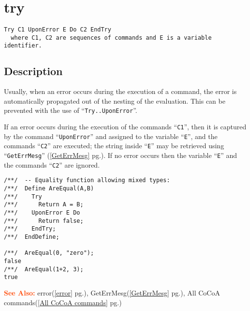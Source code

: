 \documentclass[a4paper]{mybook}
\newenvironment{command}{}{} %
\newcommand\SeeAlso{\par\textcolor{OrangeRed}{\textbf{\large See Also: }}}
\begin{document}
\section{try}
\label{try}
\begin{command} %


\begin{Verbatim}[label=syntax, rulecolor=\color{MidnightBlue},
frame=single]
Try C1 UponError E Do C2 EndTry
  where C1, C2 are sequences of commands and E is a variable identifier.
\end{Verbatim}


\subsection*{Description}

Usually, when an error occurs during the execution of a command, the
error is automatically propagated out of the nesting of the
evaluation.  This can be prevented with the use of ``\verb&Try..UponError&''.
\par 
If an error occurs during the execution of the commands ``\verb&C1&'', then it is
captured by the command ``\verb&UponError&'' and assigned to the variable ``\verb&E&'',
and the commands ``\verb&C2&'' are executed; the string inside ``\verb&E&'' may be
retrieved using ``\verb&GetErrMesg&'' (\ref{GetErrMesg} pg.\pageref{GetErrMesg}).  If no error occurs then the variable ``\verb&E&''
and the commands ``\verb&C2&'' are ignored.
\begin{Verbatim}[label=example, rulecolor=\color{PineGreen}, frame=single]
/**/  -- Equality function allowing mixed types:
/**/  Define AreEqual(A,B)
/**/    Try
/**/      Return A = B;
/**/    UponError E Do
/**/      Return false;
/**/    EndTry;
/**/  EndDefine;

/**/  AreEqual(0, "zero");
false
/**/  AreEqual(1+2, 3);
true
\end{Verbatim}


\SeeAlso %
  error(\ref{error} pg.\pageref{error}), 
    GetErrMesg(\ref{GetErrMesg} pg.\pageref{GetErrMesg}), 
    All CoCoA commands(\ref{All CoCoA commands} pg.\pageref{All CoCoA commands})
\end{command} %
\end{document}
